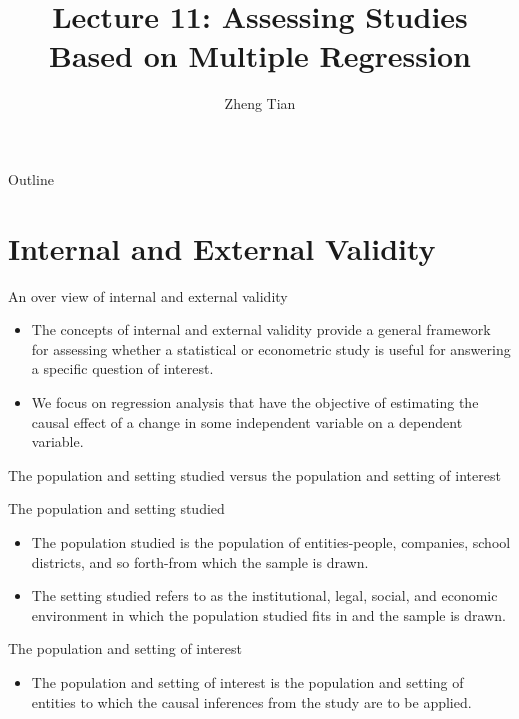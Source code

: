 \documentclass[presentation,10pt]{beamer}
\author{Zheng Tian}
\date{}
\title{Lecture 11: Assessing Studies Based on Multiple Regression}
\begin{document}
\maketitle
\begin{frame}{Outline}
\setcounter{tocdepth}{1}
\tableofcontents
\end{frame}


\section{Internal and External Validity}
\label{sec:orgf5f65ae}
\setcounter{tocdepth}{1}
\tableofcontents[currentsection]
\begin{frame}[label={sec:orgecf9c5a}]{An over view of internal and external validity}
\begin{itemize}
\item The concepts of internal and external validity provide a general
framework for assessing whether a statistical or econometric study is
useful for answering a specific question of interest.
\end{itemize}

\vspace{0.1cm} 

\begin{itemize}
\item We focus on regression analysis that have the objective
of estimating the causal effect of a change in some independent
variable on a dependent variable.
\end{itemize}
\end{frame}

\begin{frame}[label={sec:orgf98264a}]{The population and setting studied versus the population and setting of interest}
\begin{block}{The population and setting studied}
\begin{itemize}
\item The population studied is the population of entities-people,
companies, school districts, and so forth-from which the sample is
drawn.
\item The setting studied refers to as the institutional, legal, social,
and economic environment in which the population studied fits in and
the sample is drawn.
\end{itemize}
\end{block}

\begin{block}{The population and setting of interest}
\begin{itemize}
\item The population and setting of interest is the population
and setting of entities to which the causal inferences from the study
are to be applied.
\end{itemize}
\end{block}
\end{frame}
\end{document}
